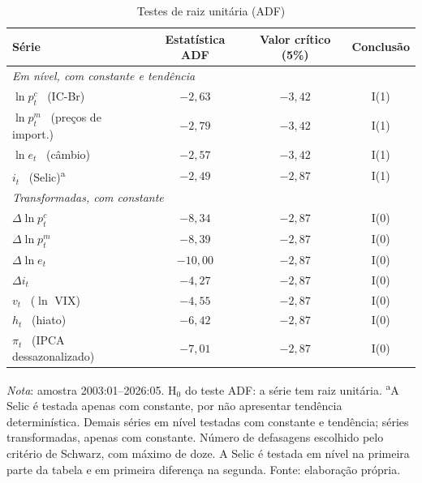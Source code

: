 \documentclass[12pt,openright,oneside,a4paper,portuguese,brazil]{abntex2}
\begin{document}
\begin{table}[htbp]
\centering
\caption{Testes de raiz unitária (ADF)}
\label{tab:raizunitaria}
\footnotesize
\begin{tabular}{lccc}
\toprule
Série & Estatística ADF & Valor crítico (5\%) & Conclusão \\
\midrule
\multicolumn{4}{l}{\textit{Em nível, com constante e tendência}} \\
$\ln p^{c}_t$ \ (IC-Br)             & $-2{,}63$  & $-3{,}42$ & I(1) \\
$\ln p^{m}_t$ \ (preços de import.) & $-2{,}79$  & $-3{,}42$ & I(1) \\
$\ln e_t$ \ (câmbio)                & $-2{,}57$  & $-3{,}42$ & I(1) \\
$i_t$ \ (Selic)\textsuperscript{a}   & $-2{,}49$  & $-2{,}87$ & I(1) \\
\midrule
\multicolumn{4}{l}{\textit{Transformadas, com constante}} \\
$\Delta\ln p^{c}_t$                 & $-8{,}34$  & $-2{,}87$ & I(0) \\
$\Delta\ln p^{m}_t$                 & $-8{,}39$  & $-2{,}87$ & I(0) \\
$\Delta\ln e_t$                     & $-10{,}00$ & $-2{,}87$ & I(0) \\
$\Delta i_t$                        & $-4{,}27$  & $-2{,}87$ & I(0) \\
$v_t$ \ ($\ln$ VIX)                 & $-4{,}55$  & $-2{,}87$ & I(0) \\
$h_t$ \ (hiato)                     & $-6{,}42$  & $-2{,}87$ & I(0) \\
$\pi_t$ \ (IPCA dessazonalizado)    & $-7{,}01$  & $-2{,}87$ & I(0) \\
\bottomrule
\end{tabular}

\vspace{2pt}
\begin{flushleft}\footnotesize
\textit{Nota}: amostra 2003:01--2026:05. H$_0$ do teste ADF: a série tem raiz
unitária. \textsuperscript{a}A Selic é testada apenas com constante, por não
apresentar tendência determinística. Demais séries em nível testadas com
constante e tendência; séries
transformadas, apenas com constante. Número de defasagens escolhido pelo
critério de Schwarz, com máximo de doze. A Selic é testada em nível na primeira
parte da tabela e em primeira diferença na segunda. Fonte: elaboração própria.
\end{flushleft}
\end{table}
\end{document}
